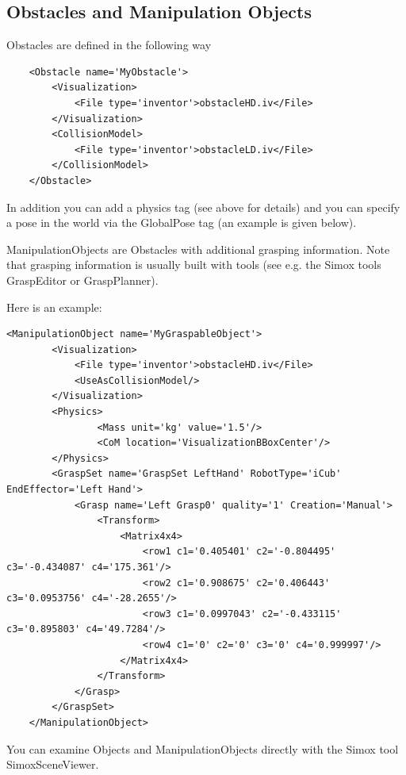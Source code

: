 \documentclass{book}
\begin{document}
\subsection{Obstacles and Manipulation Objects}
Obstacles are defined in the following way
\begin{lstlisting}
    <Obstacle name='MyObstacle'>
        <Visualization>
            <File type='inventor'>obstacleHD.iv</File>
        </Visualization>
        <CollisionModel>
            <File type='inventor'>obstacleLD.iv</File>
        </CollisionModel>
    </Obstacle>
\end{lstlisting}
In addition you can add a physics tag (see above for details) and you can specify a pose in the world via the GlobalPose tag (an example is given below).
\par
ManipulationObjects are Obstacles with additional grasping information. Note that grasping information is usually built with tools (see e.g. the Simox tools GraspEditor or GraspPlanner).
\par
Here is an example:
\begin{lstlisting}
<ManipulationObject name='MyGraspableObject'>
        <Visualization>
            <File type='inventor'>obstacleHD.iv</File>
            <UseAsCollisionModel/>
        </Visualization>
        <Physics>
                <Mass unit='kg' value='1.5'/>
                <CoM location='VisualizationBBoxCenter'/>
        </Physics>
        <GraspSet name='GraspSet LeftHand' RobotType='iCub' EndEffector='Left Hand'>
            <Grasp name='Left Grasp0' quality='1' Creation='Manual'>
                <Transform>
                    <Matrix4x4>
                        <row1 c1='0.405401' c2='-0.804495' c3='-0.434087' c4='175.361'/>
                        <row2 c1='0.908675' c2='0.406443' c3='0.0953756' c4='-28.2655'/>
                        <row3 c1='0.0997043' c2='-0.433115' c3='0.895803' c4='49.7284'/>
                        <row4 c1='0' c2='0' c3='0' c4='0.999997'/>
                    </Matrix4x4>
                </Transform>
            </Grasp>
        </GraspSet>
    </ManipulationObject>
\end{lstlisting}
You can examine Objects and ManipulationObjects directly with the Simox tool SimoxSceneViewer.
\end{document}
